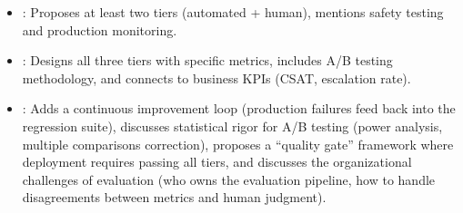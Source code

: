 \begin{interviewq}
\goodgreat
\begin{itemize}
    \item {}: Proposes at least two tiers (automated + human),
          mentions safety testing and production monitoring.
    \item {}: Designs all three tiers with specific metrics,
          includes A/B testing methodology, and connects to business KPIs
          (CSAT, escalation rate).
    \item {}: Adds a continuous improvement loop (production
          failures feed back into the regression suite), discusses
          statistical rigor for A/B testing (power analysis, multiple
          comparisons correction), proposes a ``quality gate'' framework where
          deployment requires passing all tiers, and discusses the
          organizational challenges of evaluation (who owns the evaluation
          pipeline, how to handle disagreements between metrics and human
          judgment).
\end{itemize}

\end{interviewq}

\vspace{0.5em}

